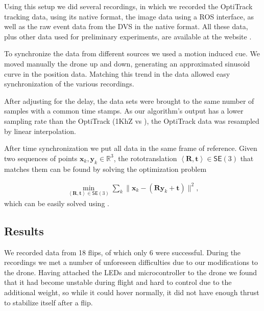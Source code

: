 Using this setup we did several recordings, in which we recorded the
OptiTrack tracking data, using its native format, the image data using
a ROS interface, as well as the raw event data from the DVS in the
native format. All these data, plus other data used for preliminary
experiments, are available at the website \xxx.

To synchronize the data from different sources we used a motion induced
cue. We moved manually the drone up and down, generating an approximated
sinusoid curve in the position data. Matching this trend in the data
allowed easy synchronization of the various recordings.

After adjusting for the delay, the data sets were brought to the same
number of samples with a common time stamps. As our algorithm's output
has a lower sampling rate than the OptiTrack (1KhZ vs \xxx), the
OptiTrack data was resampled by linear interpolation.



After time synchronization we put all data in the same frame of reference.
Given two sequences of points $\boldsymbol{x}_{k},\boldsymbol{y}_{k}\in\mathbb{R}^{3}$,
the rototranslation $\left\langle \boldsymbol{R},\boldsymbol{t}\right\rangle \in\mathsf{SE}(3)$
that matches them can be found by solving the optimization problem

\begin{equation}
\begin{aligned}\min_{\left\langle \boldsymbol{R},\boldsymbol{t}\right\rangle \in\mathsf{SE}(3)}\sum_{k}\|\boldsymbol{x}_{k}-(\boldsymbol{R}\boldsymbol{y}_{k}+\boldsymbol{t})\|^{2},\end{aligned}
\label{eq:leastsquares}
\end{equation}
which can be easily solved using \xxx.




\subsection{Results \label{sec:evaluation}}

We recorded data from 18 flips, of which only 6 were successful. During
the recordings we met a number of unforeseen difficulties due to our
modifications to the drone. Having attached the LEDs and microcontroller
to the drone we found that it had become unstable during flight and
hard to control due to the additional weight, so while it could hover
normally, it did not have enough thrust to stabilize itself after
a flip.




